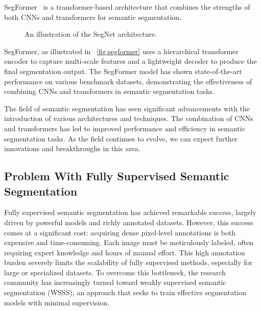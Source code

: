 SegFormer~\cite{fsss_segformer} is a transformer-based architecture that combines the strengths of both CNNs and transformers for semantic segmentation. 
\begin{figure}[htbp]
    \centering
    \caption{An illustration of the SegNet architecture.}
    \label{fig:segformer}
\end{figure}
SegFormer, as illustrated in ~\autoref{fig:segformer} uses a hierarchical transformer encoder to capture multi-scale features and a lightweight decoder to produce the final segmentation output. The SegFormer model has shown state-of-the-art performance on various benchmark datasets, demonstrating the effectiveness of combining CNNs and transformers in semantic segmentation tasks.

The field of semantic segmentation has seen significant advancements with the introduction of various architectures and techniques. The combination of CNNs and transformers has led to improved performance and efficiency in semantic segmentation tasks. As the field continues to evolve, we can expect further innovations and breakthroughs in this area.

\subsection{Problem With Fully Supervised Semantic Segmentation}
\label{subsec:problem-with-fully-supervised}
Fully supervised semantic segmentation has achieved remarkable success, largely driven by powerful models and richly annotated datasets. However, this success comes at a significant cost: acquiring dense pixel-level annotations is both expensive and time-consuming. Each image must be meticulously labeled, often requiring expert knowledge and hours of manual effort. This high annotation burden severely limits the scalability of fully supervised methods, especially for large or specialized datasets. To overcome this bottleneck, the research community has increasingly turned toward weakly supervised semantic segmentation (WSSS), an approach that seeks to train effective segmentation models with minimal supervision.

